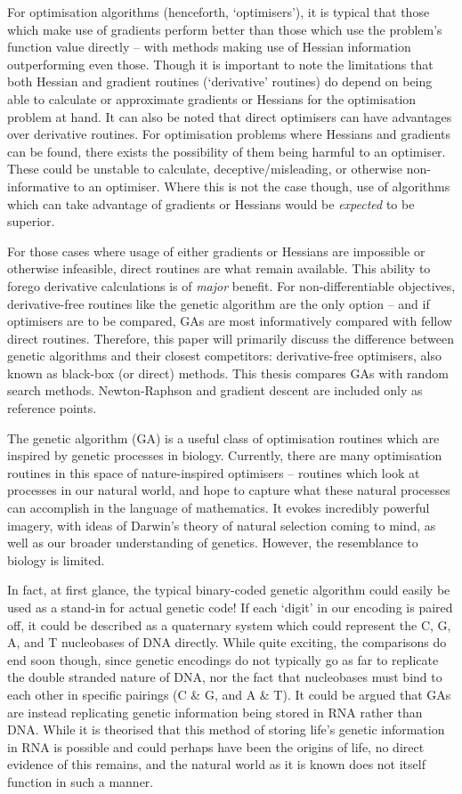 \documentclass[
  a4paper,
]{article}
\newcommand{\+}{\phantom{-}}
\begin{document}
For optimisation algorithms (henceforth, `optimisers'), it is typical
that those which make use of gradients perform better than those which
use the problem's function value directly -- with methods making use of
Hessian information outperforming even those. Though it is important to
note the limitations that both Hessian and gradient routines
(`derivative' routines) do depend on being able to calculate or
approximate gradients or Hessians for the optimisation problem at hand.
It can also be noted that direct optimisers can have advantages over
derivative routines. For optimisation problems where Hessians and
gradients can be found, there exists the possibility of them being
harmful to an optimiser. These could be unstable to calculate,
deceptive/misleading, or otherwise non-informative to an optimiser.
Where this is not the case though, use of algorithms which can take
advantage of gradients or Hessians would be \emph{expected} to be
superior.

For those cases where usage of either gradients or Hessians are
impossible or otherwise infeasible, direct routines are what remain
available. This ability to forego derivative calculations is of
\emph{major} benefit. For non-differentiable objectives, derivative-free
routines like the genetic algorithm are the only option -- and if
optimisers are to be compared, GAs are most informatively compared with
fellow direct routines. Therefore, this paper will primarily discuss the
difference between genetic algorithms and their closest competitors:
derivative-free optimisers, also known as black-box (or direct) methods.
This thesis compares GAs with random search methods. Newton-Raphson and
gradient descent are included only as reference points.

The genetic algorithm (GA) is a useful class of optimisation routines
which are inspired by genetic processes in biology. Currently, there are
many optimisation routines in this space of nature-inspired optimisers
-- routines which look at processes in our natural world, and hope to
capture what these natural processes can accomplish in the language of
mathematics. It evokes incredibly powerful imagery, with ideas of
Darwin's theory of natural selection coming to mind, as well as our
broader understanding of genetics. However, the resemblance to biology
is limited.

In fact, at first glance, the typical binary-coded genetic algorithm
could easily be used as a stand-in for actual genetic code! If each
`digit' in our encoding is paired off, it could be described as a
quaternary system which could represent the C, G, A, and T nucleobases
of DNA directly. While quite exciting, the comparisons do end soon
though, since genetic encodings do not typically go as far to replicate
the double stranded nature of DNA, nor the fact that nucleobases must
bind to each other in specific pairings (C \& G, and A \& T). It could
be argued that GAs are instead replicating genetic information being
stored in RNA rather than DNA. While it is theorised that this method of
storing life's genetic information in RNA is possible and could perhaps
have been the origins of life, no direct evidence of this remains, and
the natural world as it is known does not itself function in such a
manner.
\end{document}
